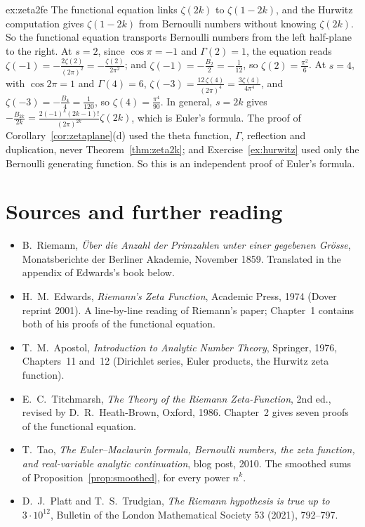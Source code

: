 \begin{solution}{ex:zeta2fe}
\idea The functional equation links $\zeta(2k)$ to $\zeta(1-2k)$, and the Hurwitz computation gives $\zeta(1-2k)$ from Bernoulli numbers without knowing
$\zeta(2k)$. So the functional equation transports Bernoulli numbers from the left half-plane to the right.
\writeup At $s=2$, since $\cos\pi=-1$ and $\Gamma(2)=1$, the equation reads $\zeta(-1)=-\frac{2\zeta(2)}{(2\pi)^2}=-\frac{\zeta(2)}{2\pi^2}$; and $\zeta(-1)=-\frac{B_2}2=-\frac1{12}$, so $\zeta(2)=\frac{\pi^2}6$. At $s=4$,
with $\cos2\pi=1$ and $\Gamma(4)=6$, $\zeta(-3)=\frac{12\,\zeta(4)}{(2\pi)^4}=\frac{3\zeta(4)}{4\pi^4}$, and $\zeta(-3)=-\frac{B_4}4=\frac1{120}$, so $\zeta(4)=\frac{\pi^4}{90}$. In general, $s=2k$ gives
$-\frac{B_{2k}}{2k}=\frac{2(-1)^k(2k-1)!}{(2\pi)^{2k}}\zeta(2k)$, which is Euler's formula. The proof of Corollary~\ref{cor:zetaplane}(d) used the theta function, $\Gamma$, reflection and duplication,
never Theorem~\ref{thm:zeta2k}; and Exercise~\ref{ex:hurwitz} used only the Bernoulli generating function. So this is an independent proof of Euler's formula.
\end{solution}

\section*{Sources and further reading}

\begin{itemize}
\item B.~Riemann, \emph{\"Uber die Anzahl der Primzahlen unter einer gegebenen Gr\"osse}, Monatsberichte der Berliner
Akademie, November 1859. Translated in the appendix of Edwards's book below.
\item H.~M.~Edwards, \emph{Riemann's Zeta Function}, Academic Press, 1974 (Dover reprint 2001). A line-by-line reading of
Riemann's paper; Chapter~1 contains both of his proofs of the functional equation.
\item T.~M.~Apostol, \emph{Introduction to Analytic Number Theory}, Springer, 1976, Chapters~11 and~12 (Dirichlet series,
Euler products, the Hurwitz zeta function).
\item E.~C.~Titchmarsh, \emph{The Theory of the Riemann Zeta-Function}, 2nd ed., revised by D.~R.~Heath-Brown, Oxford, 1986.
Chapter~2 gives seven proofs of the functional equation.
\item T.~Tao, \emph{The Euler--Maclaurin formula, Bernoulli numbers, the zeta function, and real-variable analytic continuation},
blog post, 2010. The smoothed sums of Proposition~\ref{prop:smoothed}, for every power $n^k$.
\item D.~J.~Platt and T.~S.~Trudgian, \emph{The Riemann hypothesis is true up to $3\cdot10^{12}$}, Bulletin of the London Mathematical
Society 53 (2021), 792--797.
\end{itemize}
